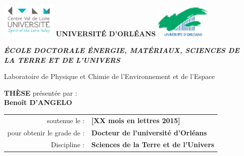 {\parindent0pt %

\includegraphics[width=0.2\textwidth, valign=c]{./images/logos/pucvl}
\hfill
{\LARGE\textbf{UNIVERSITÉ D'ORLÉANS}}
\hfill
\includegraphics[width=0.2\textwidth, valign=c]{./images/logos/univ}

\begin{center}
	{\large\textit{\textbf{ÉCOLE DOCTORALE ÉNERGIE, MATÉRIAUX, SCIENCES DE LA TERRE ET DE L'UNIVERS}}}\\

	\vspace{1.1cm}

	{\large Laboratoire de Physique et Chimie de l'Environnement et de l'Espace} \\

	\vspace{1.1cm}

	{\Large\textbf{THÈSE}} présentée par :\\
	{\Large\textbf{Benoît D'ANGELO}}\\

	\vspace{1.1cm}

	\begin{tabular}{r l}
		soutenue le : & \textbf{[XX mois en lettres 2015]} \\ [.8cm]
		pour obtenir le grade de : & \textbf{Docteur de l'universit\'e d'Orl\'eans}\\[.2cm]
		Discipline : &  \textbf{Sciences de la Terre et de l'Univers}\\
	\end{tabular}
\end{center}

}
